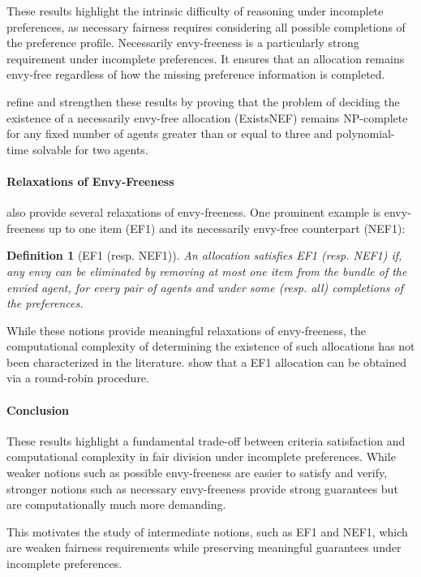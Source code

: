 \documentclass{article}
\newtheorem{definition}{Definition}
\begin{document}
These results highlight the intrinsic difficulty of reasoning under incomplete preferences, as necessary fairness requires considering all possible completions of the preference profile.
Necessarily envy-freeness is a particularly strong requirement under incomplete preferences.
It ensures that an allocation remains envy-free regardless of how the missing preference information is completed.

\cite{aziz2024computational} refine and strengthen these results by proving that the problem of deciding the existence of a necessarily envy-free allocation (ExistsNEF) remains NP-complete for any fixed number of agents greater than or equal to three and polynomial-time solvable for two agents.

\paragraph{Relaxations of Envy-Freeness} \cite{aziz2024computational} also provide several relaxations of envy-freeness.
One prominent example is envy-freeness up to one item (EF1) and its necessarily envy-free counterpart (NEF1):

\begin{definition}[EF1 (resp. NEF1)]
An allocation satisfies EF1 (resp.  NEF1) if, any envy can be eliminated by removing at most one item from the bundle of the envied agent, for every pair of agents and under some (resp. all) completions of the preferences.
\end{definition}

While these notions provide meaningful relaxations of envy-freeness, the computational complexity of determining the existence of such allocations has not been characterized in the literature. 
\cite{aziz2024computational} show that a EF1 allocation can be obtained via a round-robin procedure.

\paragraph{Conclusion} These results highlight a fundamental trade-off between criteria satisfaction and computational complexity in fair division under incomplete preferences. 
While weaker notions such as possible envy-freeness are easier to satisfy and verify, stronger notions such as necessary envy-freeness provide strong guarantees but are computationally much more demanding.

This motivates the study of intermediate notions, such as EF1 and NEF1, which are weaken fairness requirements while preserving meaningful guarantees under incomplete preferences.
\end{document}
